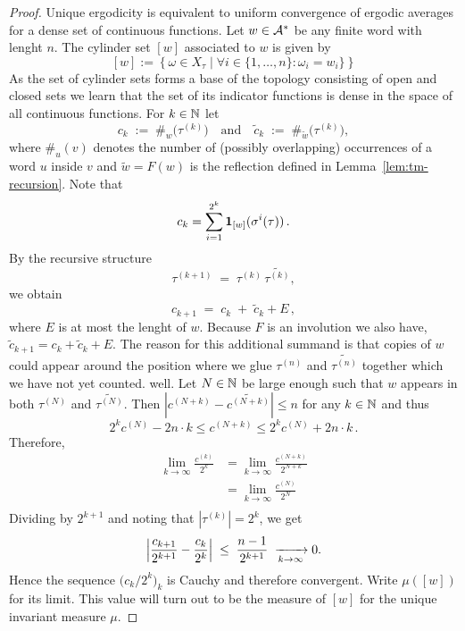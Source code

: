 \begin{proof}
	Unique ergodicity is equivalent to uniform convergence of ergodic averages for a dense set of continuous functions.
	Let $w \in \mathcal{A}^*$ be any finite word with lenght $n$.
	The cylinder set $[w]$ associated to $w$ is given by
	\[ [w] := \left\{ \omega \in X_\tau \; \vert \; \forall i \in \{ 1,\ldots,n\}: \omega_i = w_i \} \right\} \]
	As the set of cylinder sets forms a base of the topology consisting of open and closed sets we learn that the set of its indicator functions is dense in the space of all continuous functions.
	For $k\in\mathbb{N}$ let
	\[
	c_k\;:=\;\#_{w}\!\bigl(\tau^{(k)}\bigr)
	\quad\text{and}\quad
	\widetilde c_k\;:=\;\#_{\widetilde w}\!\bigl(\tau^{(k)}\bigr),
	\]
	where $\#_{u}(v)$ denotes the number of (possibly overlapping)
	occurrences of a word $u$ inside $v$ and $\widetilde{w}=F(w)$ is the
	reflection defined in Lemma~\ref{lem:tm-recursion}.
	Note that 
	\[ c_k = \sum_{i=1}^{2^k} \mathbf{1}_{[w]}(\sigma^i(\tau)) \,.\]
	By the recursive structure
	\[
	\tau^{(k+1)}\;=\;\tau^{(k)}\,\widetilde{\tau^{(k)}},
	\]
	we obtain
	\[
	c_{k+1}\;=\;c_{k}\;+\;\widetilde c_{k} + E \,,
	\tag{$\ast$}
	\]
	where $E$ is at most the lenght of $w$.
	Because $F$ is an involution we also have, $\widetilde c_{k+1} = c_{k}+\widetilde c_{k} + E$.
	The reason for this additional summand is that copies of $w$ could appear around the position where we glue $\tau^{(n)}$ and $\widetilde{\tau^{(n)}}$ together which we have not yet counted.
	well.
	Let $N \in \mathbb{N}$ be large enough such that $w$ appears in both $\tau^{(N)}$ and $\widetilde{\tau^{(N)}}$.
	Then $|c^{(N+k)} - \widetilde{c^{(N+k)}}| \leqslant n$ for any $k \in \mathbb{N}$ and thus
	\[ 2^k c^{(N)} - 2n\cdot k \leqslant c^{(N+k)} \leqslant 2^k c^{(N)} + 2n\cdot k \,. \]
    Therefore,	
	\begin{align*}
		\lim_{k \to \infty} \frac{c^{(k)}}{2^k} &= \lim_{k \to \infty} \frac{c^{(N+k)}}{2^{N+k}} \\
		&= \lim_{k \to \infty} \frac{c^{(N)}}{2^{N}} \\
	\end{align*}
	Dividing by $2^{k+1}$ and noting that $|\tau^{(k)}|=2^{k}$, we get
	\[
	\Bigl|\frac{c_{k+1}}{2^{k+1}}
		  -\frac{c_{k}}{2^{k}}\Bigr|
	\;\le\;\frac{n-1}{2^{k+1}}
	\;\xrightarrow[k\to\infty]{}0.
	\]
	Hence the sequence $\bigl(c_{k}/2^{k}\bigr)_{k}$ is Cauchy and therefore
	convergent.
	Write $\mu([w])$ for its limit.
	This value will turn out to be the measure of $[w]$ for the unique
	invariant measure $\mu$.


\end{proof}
